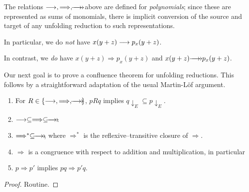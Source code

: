 \documentclass[numbers=enddot]{scrartcl}
\newcommand{\downe}[1]{{#1}{\downarrow_E}}
\newcommand{\LRA}{\Longrightarrow}
\begin{document}
\begin{rmk}
The relations $\lra, \LRA, \thra$ above are defined
    for \emph{polynomials}; since these are represented as sums of monomials,
    there is implicit conversion of the source and target of any unfolding reduction
    to such representations.

    In particular, we do \emph{not} have $x(y + z) \mathrel{\longrightarrow} p_x(y + z)$.

    In contrast, we \emph{do} have $x(y + z) \LRA p_x(y + z)$ and $x(y + z) \thra p_x(y + z)$.
\end{rmk}

Our next goal is to prove a confluence theorem for unfolding reductions.
This follows by a straightforward adaptation of the usual Martin-L\"of argument.

\begin{prop} \hfill
    \label{p:lra}
  \begin{enumerate}
    \item For $R \in \setof{\lra,\LRA,\thra}$, $pRq$ implies $\downe{q} \subseteq \downe{p}$.
    \item $\lra \subseteq \LRA \subseteq \thra$. \label{p:lra-LRA}
    \item $\LRA^* \subseteq \thra$, where $\LRA^*$ is the reflexive--transitive closure of $\LRA$.
    \label{p:lra-thra}
    \item $\LRA$ is a congruence with respect to addition and multiplication, in particular
    \item \label{p:lra-cong} $p \LRA p'$ implies $p q \LRA p' q$.
  \end{enumerate}
\end{prop}
\begin{proof}
Routine.
\end{proof}
\end{document}
